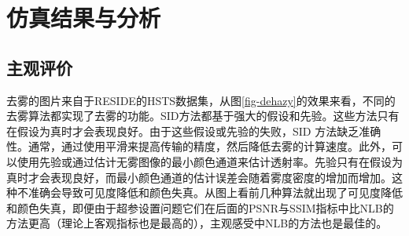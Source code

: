 \section{仿真结果与分析}
\subsection{主观评价}

去雾的图片来自于RESIDE\cite{li2019benchmarking}的HSTS数据集，从图\ref{fig-dehazy}的效果来看，不同的去雾算法都实现了去雾的功能。SID方法都基于强大的假设和先验。这些方法只有在假设为真时才会表现良好。由于这些假设或先验的失败，SID 方法缺乏准确性。通常，通过使用平滑来提高传输的精度，然后降低去雾的计算速度。此外，可以使用先验或通过估计无雾图像的最小颜色通道来估计透射率。先验只有在假设为真时才会表现良好，而最小颜色通道的估计误差会随着雾度密度的增加而增加。这种不准确会导致可见度降低和颜色失真。从图上看前几种算法就出现了可见度降低和颜色失真，即便由于超参设置问题它们在后面的PSNR与SSIM指标中比NLB的方法更高（理论上客观指标也是最高的），主观感受中NLB的方法也是最佳的。

